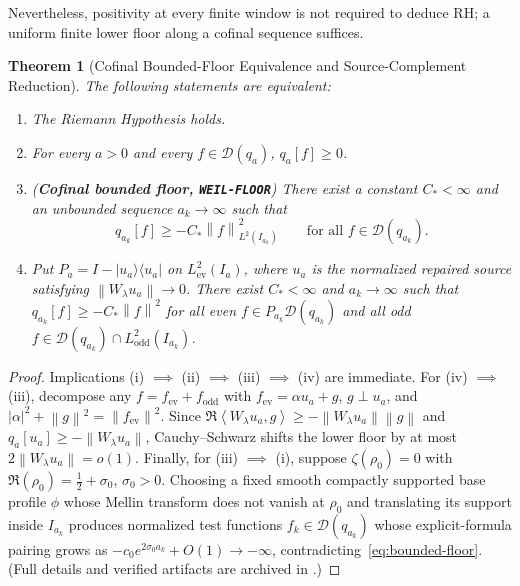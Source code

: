 \documentclass[11pt]{article}
\newtheorem{theorem}{Theorem}[section]
\theoremstyle{remark}
\newcommand{\norm}[1]{\left\lVert #1\right\rVert}
\newcommand{\ip}[2]{\left\langle #1,#2\right\rangle}
\begin{document}
Nevertheless, positivity at every finite window is not required to deduce RH; a uniform finite lower floor along a cofinal sequence suffices.

\begin{theorem}[Cofinal Bounded-Floor Equivalence and Source-Complement Reduction]
\label{thm:bounded-floor}
The following statements are equivalent:
\begin{enumerate}[label=(\roman*)]
  \item The Riemann Hypothesis holds.
  \item For every $a > 0$ and every $f \in \mathcal{D}(q_a)$, $q_a[f] \ge 0$.
  \item (\textbf{Cofinal bounded floor, \texttt{WEIL-FLOOR}}) There exist a constant $C_* < \infty$ and an unbounded sequence $a_k \to \infty$ such that
  \begin{equation}\label{eq:bounded-floor}
    q_{a_k}[f] \ge -C_*\norm{f}_{L^2(I_{a_k})}^2 \qquad \text{for all } f \in \mathcal{D}(q_{a_k}).
  \end{equation}
  \item Put $P_a = I - |u_a\rangle\langle u_a|$ on $L^2_{\mathrm{ev}}(I_a)$, where $u_a$ is the normalized repaired source satisfying $\norm{W_\lambda u_a} \to 0$. There exist $C_* < \infty$ and $a_k \to \infty$ such that $q_{a_k}[f] \ge -C_*\norm{f}^2$ for all even $f \in P_{a_k}\mathcal{D}(q_{a_k})$ and all odd $f \in \mathcal{D}(q_{a_k}) \cap L^2_{\mathrm{odd}}(I_{a_k})$.
\end{enumerate}
\end{theorem}

\begin{proof}
Implications (i) $\implies$ (ii) $\implies$ (iii) $\implies$ (iv) are immediate. For (iv) $\implies$ (iii), decompose any $f = f_{\mathrm{ev}} + f_{\mathrm{odd}}$ with $f_{\mathrm{ev}} = \alpha u_a + g$, $g \perp u_a$, and $|\alpha|^2 + \norm{g}^2 = \norm{f_{\mathrm{ev}}}^2$. Since $\Re\ip{W_\lambda u_a}{g} \ge -\norm{W_\lambda u_a}\norm{g}$ and $q_a[u_a] \ge -\norm{W_\lambda u_a}$, Cauchy--Schwarz shifts the lower floor by at most $2\norm{W_\lambda u_a} = o(1)$. Finally, for (iii) $\implies$ (i), suppose $\zeta(\rho_0) = 0$ with $\Re(\rho_0) = \tfrac{1}{2} + \sigma_0$, $\sigma_0 > 0$. Choosing a fixed smooth compactly supported base profile $\phi$ whose Mellin transform does not vanish at $\rho_0$ and translating its support inside $I_{a_k}$ produces normalized test functions $f_k \in \mathcal{D}(q_{a_k})$ whose explicit-formula pairing grows as $-c_0 e^{2\sigma_0 a_k} + O(1) \to -\infty$, contradicting~\eqref{eq:bounded-floor}. (Full details and verified artifacts are archived in .)
\end{proof}
\end{document}
